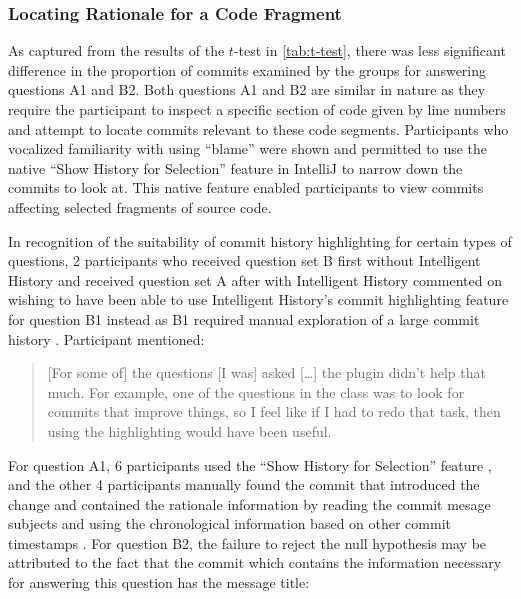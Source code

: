 \subsubsection{Locating Rationale for a Code Fragment}

As captured from the results of the $t$-test in \autoref{tab:t-test}, there was less significant difference in the proportion of commits examined by the groups for answering questions A1 and B2.
Both questions A1 and B2 are similar in nature as they require the participant to inspect a specific section of code given by line numbers and attempt to locate commits relevant to these code segments.
Participants who vocalized familiarity with using  ``blame'' were shown and permitted to use the native ``Show History for Selection'' feature in IntelliJ to narrow down the commits to look at.
This native feature enabled participants to view commits affecting selected fragments of source code.

In recognition of the suitability of commit history highlighting for certain types of questions,
2 participants who received question set B first without Intelligent History and received question set A after with Intelligent History commented on wishing to have been able to use Intelligent History's commit highlighting feature for question B1 instead as B1
required manual exploration of a large commit history .
Participant  mentioned:

\begin{quote}
  [For some of] the questions [I was] asked [\dots] the plugin didn’t help that much. 
  For example, one of the questions in the  class was to look for commits that improve things, 
  so I feel like if I had to redo that task, then using the highlighting would have been useful.
\end{quote}

For question A1, 6 participants used the ``Show History for Selection'' feature ,
and the other 4 participants manually found the commit that introduced the change and contained the rationale information by reading the commit mesage subjects and using the chronological information based on other commit timestamps .
For question B2, the failure to reject the null hypothesis may be attributed to the fact that the commit  which contains the information necessary for answering this question has the message title: 

